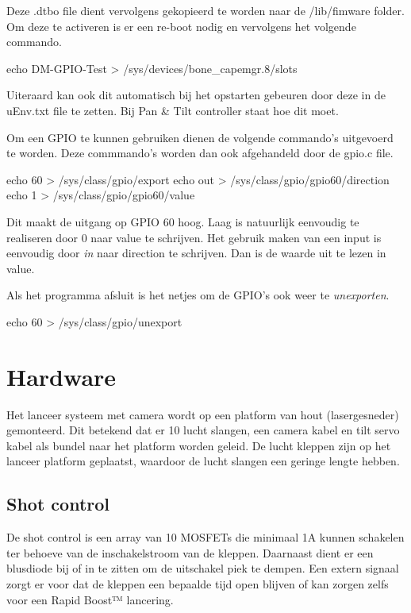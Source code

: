 Deze .dtbo file dient vervolgens gekopieerd te worden naar de /lib/fimware folder.
Om deze te activeren is er een re-boot nodig en vervolgens het volgende commando.

\begin{cppcode}
echo DM-GPIO-Test > /sys/devices/bone_capemgr.8/slots
\end{cppcode}

Uiteraard kan ook dit automatisch bij het opstarten gebeuren door deze in de
uEnv.txt file te zetten. Bij Pan \& Tilt controller staat hoe dit moet.

Om een GPIO te kunnen gebruiken dienen de volgende commando's uitgevoerd te worden.
Deze commmando's worden dan ook afgehandeld door de gpio.c file.

\begin{cppcode}
echo 60 > /sys/class/gpio/export
echo out > /sys/class/gpio/gpio60/direction
echo 1 > /sys/class/gpio/gpio60/value
\begin{cppcode}

Dit maakt de uitgang op GPIO 60 hoog. Laag is natuurlijk eenvoudig te realiseren
door 0 naar value te schrijven.
Het gebruik maken van een input is eenvoudig door \emph{in} naar direction te schrijven.
Dan is de waarde uit te lezen in value.

Als het programma afsluit is het netjes om de GPIO's ook weer te \emph{unexporten}.

\begin{cppcode}
echo 60 > /sys/class/gpio/unexport
\end{cppcode}


\section{Hardware}
\label{sec:hardware}
Het lanceer systeem met camera wordt op een platform van hout (lasergesneder)
gemonteerd. Dit betekend dat er 10 lucht slangen, een camera kabel en tilt servo
kabel als bundel naar het platform worden geleid. De lucht kleppen zijn op het
lanceer platform geplaatst, waardoor de lucht slangen een geringe lengte hebben.

\subsection{Shot control}
\label{sub:shotContr}
De shot control is een array van 10 MOSFETs die minimaal 1A kunnen schakelen ter behoeve
van de inschakelstroom van de kleppen. Daarnaast dient er een blusdiode bij of in te
zitten om de uitschakel piek te dempen. Een extern signaal zorgt er voor dat de kleppen
een bepaalde tijd open blijven of kan zorgen zelfs voor een Rapid Boost™ lancering.


\end{cppcode}
\end{cppcode}
